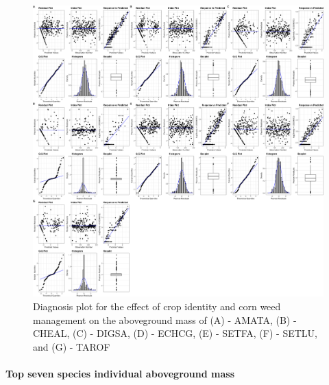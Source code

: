 \documentclass[
]{article}
\begin{document}
\begin{figure}
\centering
\includegraphics{AppendixA-model-diagnosis_files/figure-latex/sp-dens-diag-1.png}
\caption{\label{fig:sp-dens-diag}Diagnosis plot for the effect of crop identity and corn weed management on the aboveground mass of (A) - AMATA, (B) - CHEAL, (C) - DIGSA, (D) - ECHCG, (E) - SETFA, (F) - SETLU, and (G) - TAROF}
\end{figure}

\hypertarget{top-seven-species-individual-aboveground-mass}{%
\paragraph*{Top seven species individual aboveground mass}\label{top-seven-species-individual-aboveground-mass}}
\end{document}
